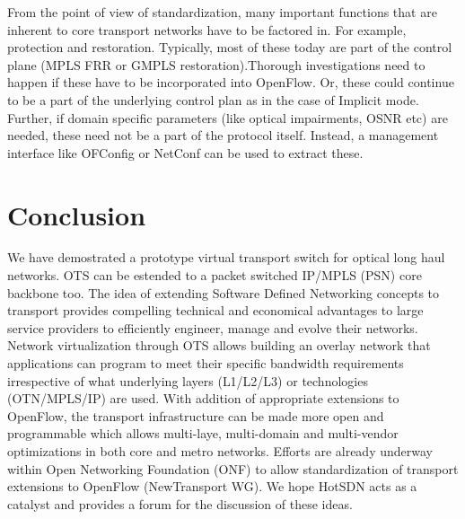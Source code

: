 \documentclass{sig-alternate-10pt}
\begin{document}
	From the point of view of standardization, many important functions that are inherent to core transport networks
	have to be factored in. For example, protection and restoration. Typically, most of these today are part of the
	control plane (MPLS FRR or GMPLS restoration).Thorough investigations need to happen if
	these have to be incorporated into OpenFlow. Or, these could continue to be a part of the underlying control
	plan as in the case of Implicit mode. Further, if domain specific parameters (like optical impairments, OSNR etc)
	are needed, these need not be a part of the protocol itself. Instead, a management interface like OFConfig or
	NetConf can be used to extract these.

\section{Conclusion}
	We have demostrated a prototype virtual transport switch for optical long haul networks. OTS can be
	estended to a packet switched IP/MPLS (PSN) core backbone too. The idea of extending Software Defined
	Networking concepts to transport provides compelling technical and economical advantages to large service
	providers to efficiently engineer, manage and evolve their networks. Network virtualization through OTS
	allows building an overlay network that applications can program to meet their specific bandwidth
	requirements irrespective of what underlying layers (L1/L2/L3) or technologies (OTN/MPLS/IP) are used.
	With addition of appropriate extensions to OpenFlow, the transport infrastructure can be made more open
	and programmable which allows multi-laye, multi-domain and multi-vendor optimizations in both core and
	metro networks. Efforts are already underway within Open Networking Foundation (ONF) to allow
	standardization of transport extensions to OpenFlow (NewTransport WG). We hope HotSDN acts as
	a catalyst and provides a forum for the discussion of these ideas.


 
\end{document}

